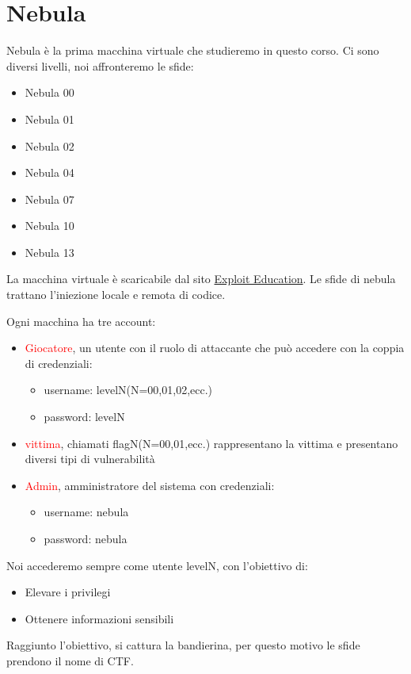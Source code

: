 \chapter{Nebula}
Nebula è la prima macchina virtuale che studieremo in questo corso. Ci sono diversi livelli, noi affronteremo le sfide:
\begin{itemize}
    \item Nebula 00
    \item Nebula 01
    \item Nebula 02
    \item Nebula 04
    \item Nebula 07
    \item Nebula 10
    \item Nebula 13
\end{itemize}
La macchina virtuale è scaricabile dal sito \href{https://exploit.education/}{Exploit Education}.
Le sfide di nebula trattano l'iniezione locale e remota di codice.

Ogni macchina ha tre account:
\begin{itemize}
    \item \textcolor{red}{Giocatore}, un utente con il ruolo di attaccante che può accedere con la coppia di credenziali:
    \begin{itemize}
        \item username: levelN(N=00,01,02,ecc.)
        \item password: levelN
    \end{itemize}
    \item \textcolor{red}{vittima}, chiamati flagN(N=00,01,ecc.) rappresentano la vittima e presentano diversi tipi di vulnerabilità
    \item \textcolor{red}{Admin}, amministratore del sistema con credenziali:
    \begin{itemize}
        \item username: nebula
        \item password: nebula
    \end{itemize}
\end{itemize}

Noi accederemo sempre come utente levelN, con l'obiettivo di:
\begin{itemize}
    \item Elevare i privilegi
    \item Ottenere informazioni sensibili
\end{itemize}

Raggiunto l'obiettivo, si cattura la bandierina, per questo motivo le sfide prendono il nome di CTF.

